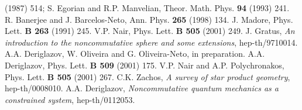 \documentclass[paper a4]{article}
\begin{document}
\begin{thebibliography}{nn}
(1987) 514; S. Egorian and R.P. Manvelian, Theor. Math. Phys.
{\bf 94} (1993) 241.
\bibitem{} R. Banerjee and J. Barcelos-Neto, Ann. Phys. {\bf 265}
(1998) 134.
\bibitem{} J. Madore, Phys. Lett. {\bf B 263} (1991) 245.
\bibitem{} V.P. Nair, Phys. Lett. {\bf B 505} (2001) 249.
\bibitem{}  J. Gratus, {\em An introduction to the noncommutative
sphere and some extensions}, hep-th/9710014.
\bibitem{} A.A. Deriglazov, W. Oliveira and G. Oliveira-Neto,
in preparation.
\bibitem{} A.A. Deriglazov, Phys. Lett. {\bf B 509} (2001) 175.
\bibitem{} V.P. Nair and A.P. Polychronakos, Phys. Lett.
{\bf B 505} (2001) 267.
\bibitem{} C.K. Zachos, {\em A survey of star product geometry},
hep-th/0008010.
\bibitem{} A.A. Deriglazov, {\em Noncommutative quantum mechanics as
a constrained system}, hep-th/0112053.
\end{thebibliography}
\end{document}
